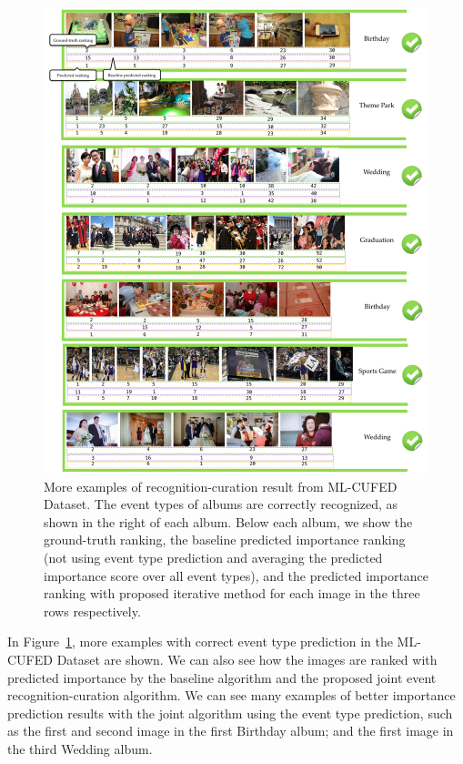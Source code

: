 \documentclass[runningheads]{llncs}
\begin{document}
\clearpage
\begin{figure}
\vspace{-0.1in}
\centering
\includegraphics[width=5in]{correct2}
\caption{More examples of recognition-curation result from ML-CUFED Dataset. The event types of albums are correctly recognized, as shown in the right of each album.  Below each album, we show the ground-truth ranking, the baseline predicted importance ranking (not using event type prediction and averaging the predicted importance score over all event types), and the predicted importance ranking with proposed iterative method for each image in the three rows respectively.}
\label{correct2}
\vspace{-0.2in}
\end{figure}


In Figure~\ref{correct2}, more examples with correct event type prediction in the ML-CUFED Dataset are shown. We can also see how the images are ranked with predicted importance by the baseline algorithm and the proposed joint event recognition-curation algorithm. We can see many examples of better importance prediction results with the joint algorithm using the event type prediction, such as the first and second image in the first Birthday album; and the first image in the third Wedding album. 
\end{document}
